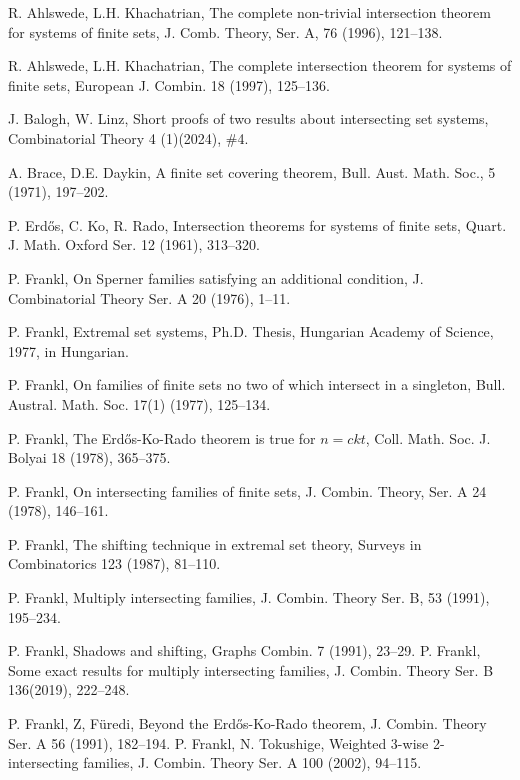 \documentclass[11pt,a4paper]{article}
\newtheorem{false statement}{False statement}
\theoremstyle{definition}
\begin{document}
\begin{thebibliography}{10}

R. Ahlswede, L.H. Khachatrian, The complete non-trivial intersection theorem for systems of finite sets,  J. Comb. Theory, Ser. A,  76 (1996), 121--138.

R. Ahlswede, L.H. Khachatrian,  The complete intersection theorem for systems of finite sets, European J. Combin. 18 (1997), 125--136.


J. Balogh, W. Linz, Short proofs of two results about intersecting set systems, Combinatorial Theory 4 (1)(2024), \#4.

A. Brace, D.E. Daykin, A finite set covering theorem,  Bull. Aust. Math. Soc.,  5 (1971), 197--202.

 P. Erd\H{o}s, C. Ko, R. Rado, Intersection theorems for systems of finite sets, Quart. J. Math. Oxford Ser. 12 (1961), 313--320.

    P. Frankl, On Sperner families satisfying an additional condition, J. Combinatorial Theory Ser. A 20 (1976), 1--11.

P. Frankl, Extremal set systems, Ph.D. Thesis, Hungarian Academy of Science, 1977, in Hungarian.

P. Frankl, On families of finite sets no two of which intersect in a singleton, Bull. Austral. Math. Soc. 17(1) (1977), 125--134.

  P. Frankl, The Erd\H{o}s-Ko-Rado theorem is true for $n = ckt$,  Coll. Math. Soc. J. Bolyai 18 (1978), 365--375.

P. Frankl, On intersecting families of finite sets, J. Combin. Theory, Ser. A 24 (1978), 146--161.

 P. Frankl, The shifting technique in extremal set theory, Surveys in Combinatorics  123 (1987), 81--110.

P. Frankl, Multiply intersecting families,  J. Combin. Theory Ser. B, 53 (1991), 195--234.

P. Frankl, Shadows and shifting, Graphs Combin. 7 (1991), 23--29.
P. Frankl,
Some exact results for multiply intersecting families, J. Combin. Theory  Ser. B 136(2019), 222--248.

    P. Frankl, Z, F\"{u}redi, Beyond the Erd\H{o}s-Ko-Rado theorem, J. Combin. Theory Ser. A 56 (1991),  182--194.
  P. Frankl, N. Tokushige, Weighted 3-wise 2-intersecting families,  J. Combin. Theory Ser. A 100 (2002),  94--115.


\end{thebibliography}
\end{document}
